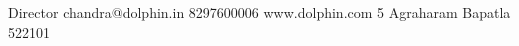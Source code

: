 \documentclass{../src-tex/amm-pst-business-card}
\begin{document}
%
\thispagestyle{empty}%
%
{Director}%
{chandra@dolphin.in}%
{8297600006}%
{www.dolphin.com}%
{5 Agraharam Bapatla 522101}%
{ }%
\end{document}
